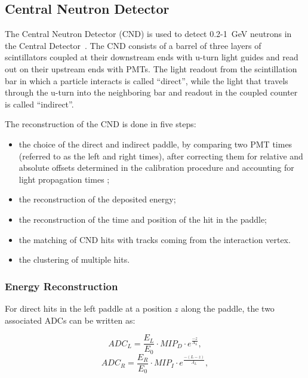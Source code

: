 \subsection{Central Neutron Detector}
\label{sec_rec_cnd}

The Central Neutron Detector (CND) is used to detect 0.2-1~GeV neutrons in the Central Detector~\cite{cnd-nim}.
The CND consists of a barrel of three layers of scintillators coupled at their downstream ends with u-turn light
guides and read out on their upstream ends with PMTs. The light readout from the scintillation bar in which a particle
interacts is called ``direct'', while the light that travels through the u-turn into the neighboring bar and readout
in the coupled counter is called ``indirect''. 

The reconstruction of the CND is done in five steps:

\begin{itemize}
\item the choice of the direct and indirect paddle, by comparing two PMT times (referred to as the left and right
  times), after correcting them for relative and absolute offsets determined in the calibration procedure and
  accounting for light propagation times \cite{cnd-nim};
\item the reconstruction of the deposited energy;
\item the reconstruction of the time and position of the hit in the paddle;
\item the matching of CND hits with tracks coming from the interaction vertex.
\item the clustering of multiple hits.
\end{itemize}

\subsubsection{Energy Reconstruction}

For direct hits in the left paddle at a position $z$ along the paddle, the two associated ADCs can be written as:

\begin{equation}
\label{eq_rec_3}
ADC_L = \frac{E_L}{E_0} \cdot MIP_D \cdot e^{\frac{-z}{A_L}},
\end{equation}
\begin{equation}
\label{eq_rec_4}
ADC_R = \frac{E_R}{E_0} \cdot MIP_I \cdot e^{\frac{-(L-z)}{A_L}},
\end{equation}

